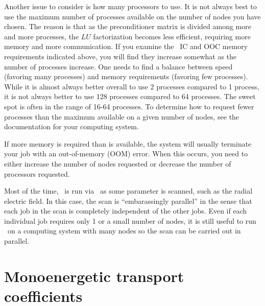 Another issue to consider is how many processors to use.  It is not always best to use the maximum number of processes
available on the number of nodes you have chosen. The reason is that as the preconditioner matrix is divided among
more and more processes, the $LU$ factorization becomes less efficient, requiring more memory and more communication.
If you examine the \mumps~IC and OOC memory requirements indicated above, you will find they increase somewhat 
as the number of processes increase.
One needs to find a balance between speed (favoring many processes) and memory requirements (favoring few processes).
While it is almost always better overall to use 2 processes compared to 1 process, it is not always better to use 128 processes
compared to 64 processes.  The sweet spot is often in the range of 16-64 processes.
To determine how to request fewer processes than the maximum available on a given number of nodes,
see the documentation for your computing system.

If more memory is required than is available, the system will usually terminate your job with an out-of-memory (OOM) error.
When this occurs, you need to either increase the number of nodes requested or decrease the number of processors
requested.

Most of the time, \sfincs~is run via \sfincsScan~as some parameter is scanned, such as the radial electric field.
In this case, the scan is ``embarassingly parallel'' in the sense that each job in the scan is completely independent
of the other jobs.  Even if each individual job requires only 1 or a small number of nodes, it is still useful
to run \sfincs~on a computing system with many nodes so the scan can be carried out in parallel.


\section{Monoenergetic transport coefficients}
\label{sec:monoenergetic}


